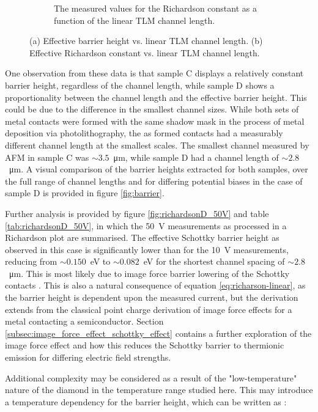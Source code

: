 \begin{refsection}
\begin{figure}[htbp]
\begin{subfigure}[b]{0.49\textwidth}
        \caption{The measured values for the Richardson constant as a function of the linear TLM channel length.}
        \label{fig:richardson}
    \end{subfigure}
    \caption{(a) Effective barrier height vs. linear TLM channel length. (b) Effective Richardson constant vs. linear TLM channel length.}
    \label{fig:side_by_side_barrier_richardson}
\end{figure}

 One observation from these data is that sample C displays a relatively constant barrier height, regardless of the channel length, while sample D shows a proportionality between the channel length and the effective barrier height. This could be due to the difference in the smallest channel sizes. While both sets of metal contacts were formed with the same shadow mask in the process of metal deposition via photolithography, the as formed contacts had a measurably different channel length at the smallest scales. The smallest channel measured by AFM in sample C was $\sim3.5$~\si{\micro\metre}, while sample D had a channel length of $\sim2.8$~\si{\micro\metre}. A visual comparison of the barrier heights extracted for both samples, over the full range of channel lengths and for differing potential biases in the case of sample D is provided in figure \ref{fig:barrier}.%

 Further analysis is provided by figure \ref{fig:richardsonD_50V} and table \ref{tab:richardsonD_50V}, in which the 50~\si{\volt} measurements as processed in a Richardson plot are summarised. The effective Schottky barrier height as observed in this case is significantly lower than for the 10~\si{\volt} measurements, reducing from $\sim0.150$~\si{\electronvolt} to $\sim0.082$~\si{\electronvolt} for the shortest channel spacing of $\sim2.8$~\si{\micro\metre}. This is most likely due to image force barrier lowering of the Schottky contacts \cite{Schroder2006-sx, sze2006}. This is also a natural consequence of equation \ref{eq:richarson-linear}, as the barrier height is dependent upon the measured current, but the derivation extends from the classical point charge derivation of image force effects for a metal contacting a semiconductor. Section \ref{subsec:image_force_effect_schottky_effect} contains a further exploration of the image force effect and how this reduces the Schottky barrier to thermionic emission for differing electric field strengths.

Additional complexity may be considered as a result of the "low-temperature" nature of the diamond in the temperature range studied here. This may introduce a temperature dependency for the barrier height, which can be written as \cite{Schroder2006-sx}:


\end{refsection}
